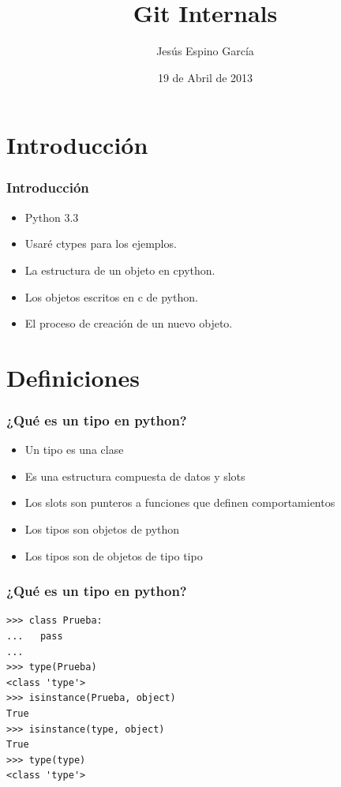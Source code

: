 \documentclass[10pt]{beamer}
\title{Git Internals}
\author{Jesús Espino García}
\date{19 de Abril de 2013}
\institute[Kaleidos]{jesus.espino@kaleidos.net\\@jespinog\\\texttt{[image: kaleidos.png]}}
\begin{document}
  \frame{\maketitle}

  \section*{Introducción}

  \begin{frame}[containsverbatim]
    \frametitle{Introducción}
    \begin{itemize}
      \item Python 3.3
      \item Usaré ctypes para los ejemplos.
      \item La estructura de un objeto en cpython.
      \item Los objetos escritos en c de python.
      \item El proceso de creación de un nuevo objeto.
    \end{itemize}
  \end{frame}

  \section*{Definiciones}

  \begin{frame}[containsverbatim]
    \frametitle{¿Qué es un tipo en python?}
    \begin{itemize}
      \item Un tipo es una clase
      \item Es una estructura compuesta de datos y slots
      \item Los slots son punteros a funciones que definen comportamientos
      \item Los tipos son objetos de python
      \item Los tipos son de objetos de tipo tipo
    \end{itemize}
  \end{frame}

  \begin{frame}[containsverbatim]
    \frametitle{¿Qué es un tipo en python?}
    \begin{verbatim}
>>> class Prueba:
...   pass
...
>>> type(Prueba)
<class 'type'>
>>> isinstance(Prueba, object)
True
>>> isinstance(type, object)
True
>>> type(type)
<class 'type'>
    \end{verbatim}
  \end{frame}
\end{document}
